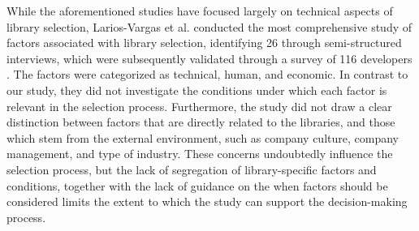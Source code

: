 While the aforementioned studies have focused largely on technical aspects of library selection, Larios-Vargas et al. conducted the most comprehensive study of factors associated with library selection, identifying 26 through semi-structured interviews, which were subsequently validated through a survey of 116 developers \cite{larios2020selecting}. The factors were categorized as technical, human, and economic. In contrast to our study, they did not investigate the conditions under which each factor is relevant in the selection process. Furthermore, the study did not draw a clear distinction between factors that are directly related to the libraries, and those which stem from the external environment, such as company culture, company management, and type of industry. These concerns undoubtedly influence the selection process, but the lack of segregation of library-specific factors and conditions, together with the lack of guidance on the when factors should be considered limits the extent to which the study can support the decision-making process.

